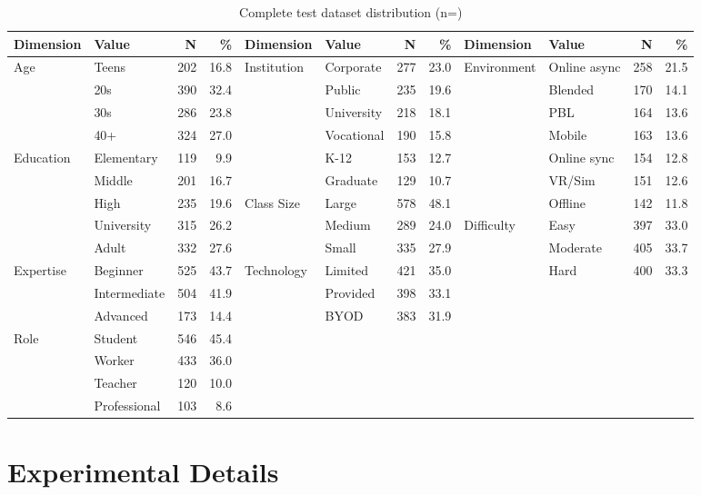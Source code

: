 \begin{table}[t]
\centering
\small
\caption{Complete test dataset distribution (n=\numtest{})}
\label{tab:full-distribution}
\begin{tabular}{llrr@{\hskip 1.5em}llrr@{\hskip 1.5em}llrr}
\toprule
\textbf{Dimension} & \textbf{Value} & \textbf{N} & \textbf{\%} & \textbf{Dimension} & \textbf{Value} & \textbf{N} & \textbf{\%} & \textbf{Dimension} & \textbf{Value} & \textbf{N} & \textbf{\%} \\
\midrule
Age & Teens & 202 & 16.8 & Institution & Corporate & 277 & 23.0 & Environment & Online async & 258 & 21.5 \\
 & 20s & 390 & 32.4 &  & Public & 235 & 19.6 &  & Blended & 170 & 14.1 \\
 & 30s & 286 & 23.8 &  & University & 218 & 18.1 &  & PBL & 164 & 13.6 \\
 & 40+ & 324 & 27.0 &  & Vocational & 190 & 15.8 &  & Mobile & 163 & 13.6 \\
\midrule
Education & Elementary & 119 & 9.9 &  & K-12 & 153 & 12.7 &  & Online sync & 154 & 12.8 \\
 & Middle & 201 & 16.7 &  & Graduate & 129 & 10.7 &  & VR/Sim & 151 & 12.6 \\
 & High & 235 & 19.6 & Class Size & Large & 578 & 48.1 &  & Offline & 142 & 11.8 \\
 & University & 315 & 26.2 &  & Medium & 289 & 24.0 & Difficulty & Easy & 397 & 33.0 \\
 & Adult & 332 & 27.6 &  & Small & 335 & 27.9 &  & Moderate & 405 & 33.7 \\
\midrule
Expertise & Beginner & 525 & 43.7 & Technology & Limited & 421 & 35.0 &  & Hard & 400 & 33.3 \\
 & Intermediate & 504 & 41.9 &  & Provided & 398 & 33.1 & & & & \\
 & Advanced & 173 & 14.4 &  & BYOD & 383 & 31.9 & & & & \\
\midrule
Role & Student & 546 & 45.4 & & & & & & & & \\
 & Worker & 433 & 36.0 & & & & & & & & \\
 & Teacher & 120 & 10.0 & & & & & & & & \\
 & Professional & 103 & 8.6 & & & & & & & & \\
\bottomrule
\end{tabular}
\end{table}

\section{Experimental Details}
\label{app:experimental}

